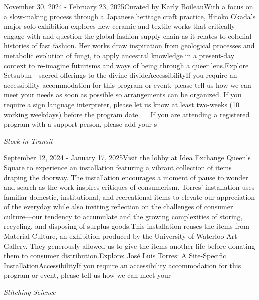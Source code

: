 \documentclass[letterpaper, 10pt]{article}
\newcommand{\subtitle}[1]{\textit{\large #1}\vspace{0.5em}}
\newcommand{\articlecontent}[1]{\small #1\vspace{1em}}
\begin{document}
\begin{multicols}{2}
{November 30, 2024 - February 23, 2025Curated by Karly BoileauWith a focus on a slow-making process through a Japanese heritage craft practice, Hitoko Okada’s major solo exhibition explores new ceramic and textile works that critically engage with and question the global fashion supply chain as it relates to colonial histories of fast fashion. Her works draw inspiration from geological processes and metabolic evolution of fungi, to apply ancestral knowledge in a present-day context to re-imagine futurisms and ways of being through a queer lens.Explore Setsubun - sacred offerings to the divine divideAccessibilityIf you require an accessibility accommodation for this program or event, please tell us how we can meet your needs as soon as possible so arrangements can be organized. If you require a sign language interpreter, please let us know at least two-weeks (10 working weekdays) before the program date.   If you are attending a registered program with a support person, please add your s
}
\vspace{10px}

\subtitle{Stock-in-Transit}

\articlecontent{

\qrcode[height=1.5cm]{https://ideaexchange.libnet.info/event/11807061}
\vspace{10px}

September 12, 2024 - January 17, 2025Visit the lobby at Idea Exchange Queen's Square to experience an installation featuring a vibrant collection of items draping the doorway. The installation encourages a moment of pause to wonder and search as the work inspires critiques of consumerism. Torres’ installation uses familiar domestic, institutional, and recreational items to elevate our appreciation of the everyday while also inviting reflection on the challenges of consumer culture—our tendency to accumulate and the growing complexities of storing, recycling, and disposing of surplus goods.This installation reuses the items from Material Culture, an exhibition produced by the University of Waterloo Art Gallery. They generously allowed us to give the items another life before donating them to consumer distribution.Explore: José Luis Torres: A Site-Specific InstallationAccessibilityIf you require an accessibility accommodation for this program or event, please tell us how we can meet your
}
\vspace{10px}

\subtitle{Stitching Science}

\articlecontent{

}
\end{multicols}
\end{document}
